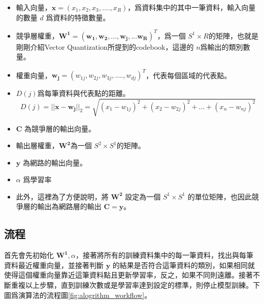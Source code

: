\begin{itemize}
	\item
	      輸入向量，\(\mathbf{x} = (x_1,x_2,x_3,....,x_R)\)，爲資料集中的其中一筆資料，輸入向量的數量 \(d\) 爲資料的特徵數量。


	\item
	      競爭層權重，\(\mathbf{W^1} = (\mathbf{w_1,w_2,...,w_j,...w_R})^T\)，爲一個 \(S^1 \times R \)的矩陣，也就是剛剛介紹Vector Quantization所提到的codebook，這邊的 \(n\)爲輸出的類別數量。
	\item
		權重向量，\(\mathbf{w_{j}} = (w_{1j},w_{2j},w_{3j},....,w_{dj})^T\)，代表每個區域的代表點。

	\item
	      \(D(j)\)爲每筆資料與代表點的距離。
	      $$D(j)=||\mathbf{x}-\mathbf{w_j}||_2 = \sqrt{(x_1-w_{1j})^2+(x_2-w_{2j})^2+...+(x_n-w_{nj})^2} $$


	\item
		\(\mathbf{C}\) 為競爭層的輸出向量。

	\item
	      輸出層權重，\(\mathbf{W^2} \)為一個 \(S^2 \times S^1\)的矩陣。

	\item
		\(\mathbf{y}\) 為網路的輸出向量。

	\item
	      \(\alpha\) 爲學習率
	\item
		此外，這裡為了方便說明，將 \(\mathbf{W^2}\) 設定為一個 \(S^1 \times S^1\) 的單位矩陣，也因此競爭層的輸出為網路層的輸出 \(\mathbf{C} = \mathbf{y}\)。

\end{itemize}


\subsection{流程}

首先會先初始化 \(\mathbf{W^1},\alpha\)，接著將所有的訓練資料集中的每一筆資料，找出與每筆資料最近權重向量，並接著判斷 \(\mathbf{y}\) 的結果是否符合這筆資料的類別，如果相同就使得這個權重向量靠近這筆資料點且更新學習率，反之，如果不同則遠離。接著不斷重複以上步驟，直到訓練次數或是學習率達到設定的標準，則停止模型訓練。下圖爲演算法的流程圖\ref{fig:alogrithm_workflow}。

\newpage

\usetikzlibrary{positioning, shapes.geometric}



